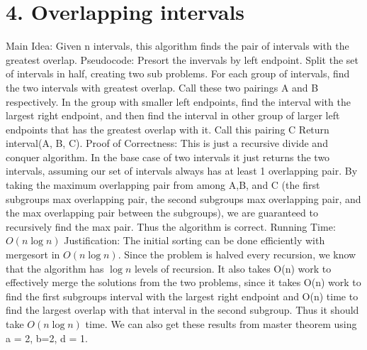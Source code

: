 \documentclass[11pt]{article}
\begin{document}
\section*{4. Overlapping intervals}
Main Idea: \newline
Given n intervals, this algorithm finds the pair of intervals with the greatest overlap.\newline
Pseudocode:\newline
Presort the invervals by left endpoint.\newline
Split the set of intervals in half, creating two sub problems.\newline
For each group of intervals, find the two intervals with greatest overlap. Call these two pairings A and B respectively.\newline
In the group with smaller left endpoints, find the interval with the largest right endpoint, and then find the interval in other group of larger left endpoints that has the greatest overlap with it. Call this pairing C
Return interval(A, B, C).\newline
Proof of Correctness:\newline
This is just a recursive divide and conquer algorithm. In the base case of two intervals it just returns the two intervals, assuming our set of intervals always has at least 1 overlapping pair. By taking the maximum overlapping pair from among A,B, and C (the first subgroups max overlapping pair, the second subgroups max overlapping pair, and the max overlapping pair between the subgroups), we are guaranteed to recursively find the max pair. Thus the algorithm is correct.\newline
Running Time:\newline
$O(n\log n)$\newline
Justification:\newline
The initial sorting can be done efficiently with mergesort in $O(n \log n)$. Since the problem is halved every recursion, we know that the algorithm has $\log n$ levels of recursion. It also takes O(n) work to effectively merge the solutions from the two problems, since it takes O(n) work to find the first subgroups interval with the largest right endpoint and O(n) time to find the largest overlap with that interval in the second subgroup. Thus it should take $O(n\log n)$ time. We can also get these results from master theorem using a = 2, b=2, d = 1.

\newpage
\end{document}
